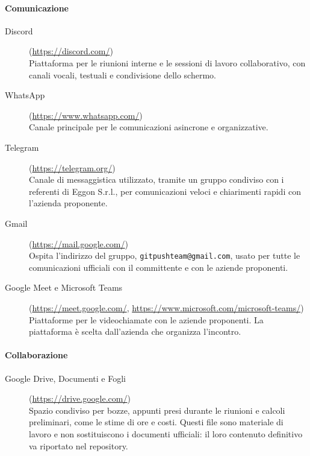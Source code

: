 \documentclass[documento]{gpt}
\begin{document}
	\paragraph{Comunicazione}
	\begin{description}
		\item[Discord] (\url{https://discord.com/}) \hfill \\
		Piattaforma per le riunioni interne e le sessioni di lavoro
		collaborativo, con canali vocali, testuali e condivisione dello
		schermo.
		\item[WhatsApp] (\url{https://www.whatsapp.com/}) \hfill \\
		Canale principale per le comunicazioni asincrone e organizzative.
		\item[Telegram] (\url{https://telegram.org/}) \hfill \\
		Canale di messaggistica utilizzato, tramite un gruppo condiviso con i
		referenti di Eggon S.r.l., per comunicazioni veloci e chiarimenti
		rapidi con l'azienda proponente.
		\item[Gmail] (\url{https://mail.google.com/}) \hfill \\
		Ospita l'indirizzo del gruppo, \texttt{gitpushteam@gmail.com}, usato
		per tutte le comunicazioni ufficiali con il committente e con le
		aziende proponenti.
		\item[Google Meet e Microsoft Teams] (\url{https://meet.google.com/},
		\url{https://www.microsoft.com/microsoft-teams/}) \hfill \\
		Piattaforme per le videochiamate con le aziende proponenti. La
		piattaforma è scelta dall'azienda che organizza l'incontro.
	\end{description}
	
	\paragraph{Collaborazione}\label{sec:strumenti-collaborazione}
	\begin{description}
		\item[Google Drive, Documenti e Fogli] (\url{https://drive.google.com/})
		\hfill \\
		Spazio condiviso per bozze, appunti presi durante le riunioni e
		calcoli preliminari, come le stime di ore e costi. Questi file sono
		materiale di lavoro e non sostituiscono i documenti ufficiali: il
		loro contenuto definitivo va riportato nel repository.
	\end{description}
	
\end{document}
